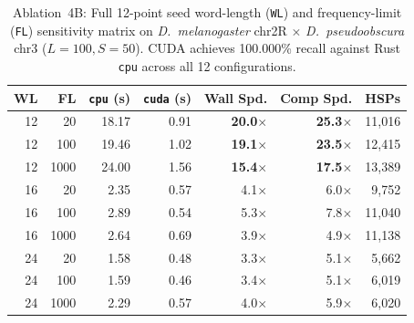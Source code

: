 \documentclass[pdflatex,sn-vancouver,Numbered]{sn-jnl}
\newcommand{\eFourBWTwelveFTwentyCpu}{18.17}    \newcommand{\eFourBWTwelveFTwentyCuda}{0.91}    \newcommand{\eFourBWTwelveFTwentySp}{20.0$\times$}    \newcommand{\eFourBWTwelveFTwentyCompSp}{25.3$\times$}    \newcommand{\eFourBWTwelveFTwentyFrags}{11,016}
\newcommand{\eFourBWTwelveFHundCpu}{19.46}      \newcommand{\eFourBWTwelveFHundCuda}{1.02}      \newcommand{\eFourBWTwelveFHundSp}{19.1$\times$}      \newcommand{\eFourBWTwelveFHundCompSp}{23.5$\times$}      \newcommand{\eFourBWTwelveFHundFrags}{12,415}
\newcommand{\eFourBWTwelveFThouCpu}{24.00}      \newcommand{\eFourBWTwelveFThouCuda}{1.56}      \newcommand{\eFourBWTwelveFThouSp}{15.4$\times$}      \newcommand{\eFourBWTwelveFThouCompSp}{17.5$\times$}      \newcommand{\eFourBWTwelveFThouFrags}{13,389}
\newcommand{\eFourBWSixteenFTwentyCpu}{2.35}    \newcommand{\eFourBWSixteenFTwentyCuda}{0.57}   \newcommand{\eFourBWSixteenFTwentySp}{4.1$\times$}    \newcommand{\eFourBWSixteenFTwentyCompSp}{6.0$\times$}    \newcommand{\eFourBWSixteenFTwentyFrags}{9,752}
\newcommand{\eFourBWSixteenFHundCpu}{2.89}      \newcommand{\eFourBWSixteenFHundCuda}{0.54}     \newcommand{\eFourBWSixteenFHundSp}{5.3$\times$}      \newcommand{\eFourBWSixteenFHundCompSp}{7.8$\times$}      \newcommand{\eFourBWSixteenFHundFrags}{11,040}
\newcommand{\eFourBWSixteenFThouCpu}{2.64}      \newcommand{\eFourBWSixteenFThouCuda}{0.69}     \newcommand{\eFourBWSixteenFThouSp}{3.9$\times$}      \newcommand{\eFourBWSixteenFThouCompSp}{4.9$\times$}      \newcommand{\eFourBWSixteenFThouFrags}{11,138}
\newcommand{\eFourBWTwentyFourFTwentyCpu}{1.58} \newcommand{\eFourBWTwentyFourFTwentyCuda}{0.48}\newcommand{\eFourBWTwentyFourFTwentySp}{3.3$\times$} \newcommand{\eFourBWTwentyFourFTwentyCompSp}{5.1$\times$} \newcommand{\eFourBWTwentyFourFTwentyFrags}{5,662}
\newcommand{\eFourBWTwentyFourFHundCpu}{1.59}   \newcommand{\eFourBWTwentyFourFHundCuda}{0.46}  \newcommand{\eFourBWTwentyFourFHundSp}{3.4$\times$}   \newcommand{\eFourBWTwentyFourFHundCompSp}{5.1$\times$}   \newcommand{\eFourBWTwentyFourFHundFrags}{6,019}
\newcommand{\eFourBWTwentyFourFThouCpu}{2.29}   \newcommand{\eFourBWTwentyFourFThouCuda}{0.57}  \newcommand{\eFourBWTwentyFourFThouSp}{4.0$\times$}   \newcommand{\eFourBWTwentyFourFThouCompSp}{5.9$\times$}   \newcommand{\eFourBWTwentyFourFThouFrags}{6,020}
\begin{document}
\begin{table}[ht]
\centering
\scriptsize
\setlength{\tabcolsep}{2.2pt}
\caption{Ablation~4B: Full 12-point seed word-length (\texttt{WL}) and frequency-limit (\texttt{FL}) sensitivity matrix on \textit{D.~melanogaster} chr2R $\times$ \textit{D.~pseudoobscura} chr3 ($L=100, S=50$). CUDA achieves 100.000\% recall against Rust \texttt{cpu} across all 12 configurations.}\label{tab:exp4b}
\begin{tabular*}{\textwidth}{@{\extracolsep\fill}rrrrrrr}
\toprule
WL & FL & \texttt{cpu} (s) & \texttt{cuda} (s) & Wall Spd. & Comp Spd. & HSPs \\
\midrule
12 &   20 & \eFourBWTwelveFTwentyCpu     & \eFourBWTwelveFTwentyCuda     & \textbf{\eFourBWTwelveFTwentySp}     & \textbf{\eFourBWTwelveFTwentyCompSp}     & \eFourBWTwelveFTwentyFrags \\
12 &  100 & \eFourBWTwelveFHundCpu       & \eFourBWTwelveFHundCuda       & \textbf{\eFourBWTwelveFHundSp}       & \textbf{\eFourBWTwelveFHundCompSp}       & \eFourBWTwelveFHundFrags \\
12 & 1000 & \eFourBWTwelveFThouCpu       & \eFourBWTwelveFThouCuda       & \textbf{\eFourBWTwelveFThouSp}       & \textbf{\eFourBWTwelveFThouCompSp}       & \eFourBWTwelveFThouFrags \\
16 &   20 & \eFourBWSixteenFTwentyCpu    & \eFourBWSixteenFTwentyCuda    & \eFourBWSixteenFTwentySp             & \eFourBWSixteenFTwentyCompSp             & \eFourBWSixteenFTwentyFrags \\
16 &  100 & \eFourBWSixteenFHundCpu      & \eFourBWSixteenFHundCuda      & \eFourBWSixteenFHundSp               & \eFourBWSixteenFHundCompSp               & \eFourBWSixteenFHundFrags \\
16 & 1000 & \eFourBWSixteenFThouCpu      & \eFourBWSixteenFThouCuda      & \eFourBWSixteenFThouSp               & \eFourBWSixteenFThouCompSp               & \eFourBWSixteenFThouFrags \\
24 &   20 & \eFourBWTwentyFourFTwentyCpu & \eFourBWTwentyFourFTwentyCuda & \eFourBWTwentyFourFTwentySp          & \eFourBWTwentyFourFTwentyCompSp          & \eFourBWTwentyFourFTwentyFrags \\
24 &  100 & \eFourBWTwentyFourFHundCpu   & \eFourBWTwentyFourFHundCuda   & \eFourBWTwentyFourFHundSp            & \eFourBWTwentyFourFHundCompSp            & \eFourBWTwentyFourFHundFrags \\
24 & 1000 & \eFourBWTwentyFourFThouCpu   & \eFourBWTwentyFourFThouCuda   & \eFourBWTwentyFourFThouSp            & \eFourBWTwentyFourFThouCompSp            & \eFourBWTwentyFourFThouFrags \\

\end{tabular*}
\end{table}
\end{document}
